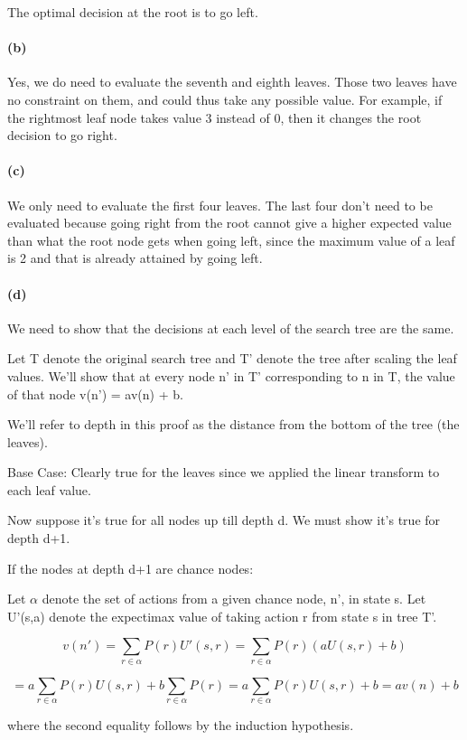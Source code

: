 \documentclass[11pt,a4paper]{article}
\begin{document}
The optimal decision at the root is to go left.

\paragraph*{(b)}
Yes, we do need to evaluate the seventh and eighth leaves. Those two leaves have no constraint on them, and could thus take any possible value. For example, if the rightmost leaf node takes value 3 instead of 0, then it changes the root decision to go right. 

\paragraph*{(c)}
We only need to evaluate the first four leaves. The last four don't need to be evaluated because going right from the root cannot give a higher expected value than what the root node gets when going left, since the maximum value of a leaf is 2 and that is already attained by going left. 

\paragraph*{(d)}
We need to show that the decisions at each level of the search tree are the same.

Let T denote the original search tree and T' denote the tree after scaling the leaf values. We'll show that at every node n' in T' corresponding to n in T, the value of that node v(n') = av(n) + b.

We'll refer to depth in this proof as the distance from the bottom of the tree (the leaves). 

Base Case: Clearly true for the leaves since we applied the linear transform to each leaf value.

Now suppose it's true for all nodes up till depth d. We must show it's true for depth d+1.

If the nodes at depth d+1 are chance nodes:

Let $\alpha$ denote the set of actions from a given chance node, n', in state s. Let U'(s,a) denote the expectimax value of taking action r from state s in tree T'. 

$$v(n') = \sum_{r \in \alpha} P(r)U'(s,r) = \sum_{r \in \alpha} P(r)(aU(s,r) + b)$$

$$ = a \sum_{r \in \alpha} P(r)U(s,r) + b\sum_{r \in \alpha} P(r) = a \sum_{r \in \alpha} P(r)U(s,r) + b = av(n) + b$$

where the second equality follows by the induction hypothesis. 
\newline
\end{document}
